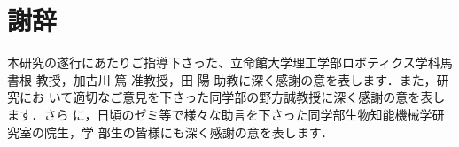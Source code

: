\section*{謝辞}

本研究の遂行にあたりご指導下さった、立命館大学理工学部ロボティクス学科馬
書根 教授，加古川 篤 准教授，田 陽 助教に深く感謝の意を表します．また，研究にお
いて適切なご意見を下さった同学部の野方誠教授に深く感謝の意を表します．さら
に，日頃のゼミ等で様々な助言を下さった同学部生物知能機械学研究室の院生，学
部生の皆様にも深く感謝の意を表します．
